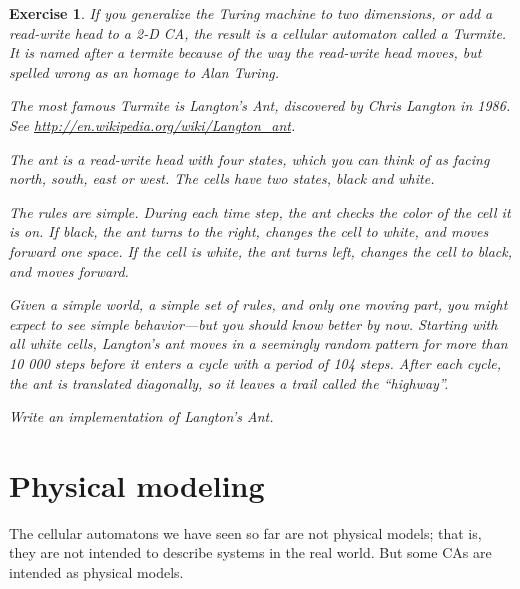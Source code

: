 \documentclass[12pt]{book}
\theoremstyle{exercise}
\newtheorem{exercise}{Exercise}[chapter]
\begin{document}
\begin{exercise}

If you generalize the Turing machine to two dimensions, or
add a read-write head to a 2-D CA, the result is a
cellular automaton called a Turmite.  It is named after a
termite because of the way the read-write head moves, but
spelled wrong as an homage to Alan Turing.


The most famous Turmite is Langton's Ant, discovered by Chris Langton
in 1986.  See \url{http://en.wikipedia.org/wiki/Langton_ant}.


The ant is a read-write head with
four states, which you can think of as facing north, south,
east or west.  The cells have two states, black and white.


The rules are simple.  During each time step, the ant checks the color
of the cell it is on.  If black, the ant turns to the right,
changes the cell to white, and moves forward one space.  If the cell
is white, the ant turns left, changes the cell to black, and moves
forward.


Given a simple world, a simple set of rules, and only one moving part,
you might expect to see simple behavior---but you should know
better by now.  Starting with all white cells, Langton's ant
moves in a seemingly random pattern for more than 10 000 steps
before it enters a cycle with a period of 104 steps.  After
each cycle, the ant is translated diagonally, so it leaves
a trail called the ``highway''.


Write an implementation of Langton's Ant.

\end{exercise}




\chapter{Physical modeling}
\label{modeling}

The cellular automatons we have seen so far are not physical models;
that is, they are not intended to describe systems in the real world.
But some CAs are intended as physical models.
\end{document}
